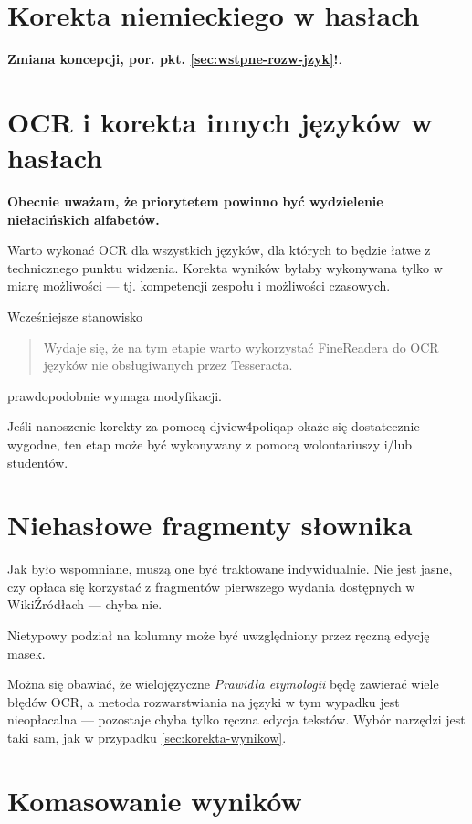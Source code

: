 \documentclass[12]{mwart}
\newcommand{\program}[1]{\textsf{#1}}
\begin{document}
\section{Korekta niemieckiego w hasłach}
\label{sec:korekta-niemieckiego}

\textbf{Zmiana koncepcji,
  por. pkt. \ref{sec:wstpne-rozw-jzyk}!}.


\section{OCR i korekta innych języków w hasłach}
\label{sec:ocr-i-korekta}

\textbf{Obecnie uważam, że priorytetem powinno być wydzielenie
  niełacińskich alfabetów.}

Warto wykonać OCR dla wszystkich języków, dla których to będzie łatwe
z technicznego punktu widzenia. Korekta wyników byłaby wykonywana
tylko w miarę możliwości --- tj. kompetencji zespołu i możliwości
czasowych. 

Wcześniejsze stanowisko
\begin{quote}
  Wydaje się, że na tym etapie warto wykorzystać \program{FineReadera}
  do OCR języków nie obsługiwanych przez \program{Tesseracta}.
\end{quote}
prawdopodobnie wymaga modyfikacji.

Jeśli nanoszenie korekty za pomocą \textsf{djview4poliqap} okaże się
dostatecznie wygodne, ten etap może być wykonywany z pomocą
wolontariuszy i/lub studentów.

\section{Niehasłowe fragmenty słownika}
\label{sec:nieh-fragm-sown}

Jak było wspomniane, muszą one być traktowane indywidualnie. Nie jest
jasne, czy opłaca się korzystać z fragmentów pierwszego wydania
dostępnych w WikiŹródłach --- chyba nie.

Nietypowy podział na kolumny może być uwzględniony przez ręczną edycję
masek.

Można się obawiać, że wielojęzyczne \textit{Prawidła etymologii} będę
zawierać wiele błędów OCR, a metoda rozwarstwiania na języki w tym
wypadku jest nieopłacalna --- pozostaje chyba tylko ręczna edycja
tekstów. Wybór narzędzi jest taki sam, jak w przypadku
\ref{sec:korekta-wynikow}.


\section{Komasowanie wyników}
\label{sec:komasowanie-wynikow}
\end{document}
